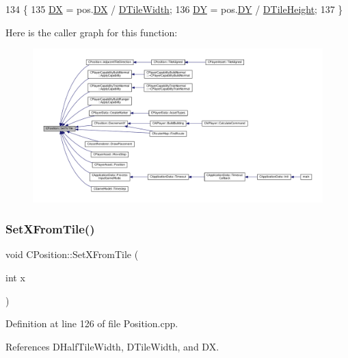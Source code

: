 \begin{DoxyCode}
134                                              \{
135     \hyperlink{classCPosition_a28445f9b872169715919074d82044eda}{DX} = pos.\hyperlink{classCPosition_a28445f9b872169715919074d82044eda}{DX} / \hyperlink{classCPosition_ac17d12fb5d35fcf62d63bb42e8cf7ed6}{DTileWidth};
136     \hyperlink{classCPosition_a84139c9e8eb547e7cf3cb851739943a4}{DY} = pos.\hyperlink{classCPosition_a84139c9e8eb547e7cf3cb851739943a4}{DY} / \hyperlink{classCPosition_a202ebb83e86df75cfb76cf1241ba817c}{DTileHeight};
137 \}
\end{DoxyCode}
Here is the caller graph for this function\+:\nopagebreak
\begin{figure}[H]
\begin{center}
\leavevmode
\includegraphics[width=350pt]{classCPosition_ae302aa21792de64c97de29e2cbbfeb94_icgraph}
\end{center}
\end{figure}
\hypertarget{classCPosition_ac6a1eeaeb98e20942efea7cf253b2ec4}{}\label{classCPosition_ac6a1eeaeb98e20942efea7cf253b2ec4} 
\subsubsection{\texorpdfstring{Set\+X\+From\+Tile()}{SetXFromTile()}}
{\footnotesize\ttfamily void C\+Position\+::\+Set\+X\+From\+Tile (\begin{DoxyParamCaption}\item[{int}]{x }\end{DoxyParamCaption})}



Definition at line 126 of file Position.\+cpp.



References D\+Half\+Tile\+Width, D\+Tile\+Width, and DX.



